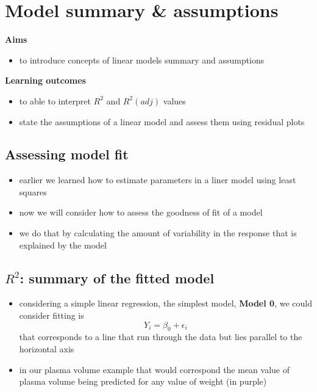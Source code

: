 \documentclass[
]{book}
\providecommand{\tightlist}{%
  \setlength{\itemsep}{0pt}\setlength{\parskip}{0pt}}
\theoremstyle{definition}
\theoremstyle{definition}
\theoremstyle{definition}
\theoremstyle{remark}
\begin{document}
\hypertarget{model-summary-assumptions}{%
\chapter{Model summary \& assumptions}\label{model-summary-assumptions}}

\textbf{Aims}

\begin{itemize}
\tightlist
\item
  to introduce concepts of linear models summary and assumptions
\end{itemize}

\textbf{Learning outcomes}

\begin{itemize}
\tightlist
\item
  to able to interpret \(R^2\) and \(R^2(adj)\) values
\item
  state the assumptions of a linear model and assess them using residual plots
\end{itemize}

\hypertarget{assessing-model-fit}{%
\section{Assessing model fit}\label{assessing-model-fit}}

\begin{itemize}
\tightlist
\item
  earlier we learned how to estimate parameters in a liner model using least squares
\item
  now we will consider how to assess the goodness of fit of a model
\item
  we do that by calculating the amount of variability in the response that is explained by the model
\end{itemize}

\hypertarget{r2-summary-of-the-fitted-model}{%
\section{\texorpdfstring{\(R^2\): summary of the fitted model}{R\^{}2: summary of the fitted model}}\label{r2-summary-of-the-fitted-model}}

\begin{itemize}
\tightlist
\item
  considering a simple linear regression, the simplest model, \textbf{Model 0}, we could consider fitting is \[Y_i = \beta_0+ \epsilon_i\] that corresponds to a line that run through the data but lies parallel to the horizontal axis
\item
  in our plasma volume example that would correspond the mean value of plasma volume being predicted for any value of weight (in purple)
\end{itemize}
\end{document}
